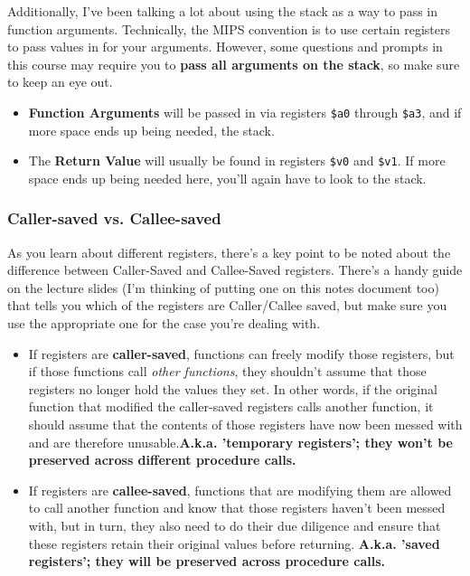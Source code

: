 \documentclass[english, 10pt]{article}
\begin{document}
Additionally, I've been talking a lot about using the stack as a way to pass in function arguments. Technically, the MIPS convention is to use certain registers to pass values in for your arguments. However, some questions and prompts in this course may require you to \textbf{pass all arguments on the stack}, so make sure to keep an eye out.

\begin{itemize}
	\item \textbf{Function Arguments} will be passed in via registers \texttt{\$a0} through \texttt{\$a3}, and if more space ends up being needed, the stack.
	\item The \textbf{Return Value} will usually be found in registers \texttt{\$v0} and \texttt{\$v1}. If more space ends up being needed here, you'll again have to look to the stack. 
\end{itemize}

\subsubsection{Caller-saved vs. Callee-saved}

As you learn about different registers, there's a key point to be noted about the difference between Caller-Saved and Callee-Saved registers. There's a handy guide on the lecture slides (I'm thinking of putting one on this notes document too) that tells you which of the registers are Caller/Callee saved, but make sure you use the appropriate one for the case you're dealing with.\newline

\begin{itemize}
	\item If registers are \textbf{caller-saved}, functions can freely modify those registers, but if those functions call \textit{other functions}, they shouldn't assume that those registers no longer hold the values they set. In other words, if the original function that modified the caller-saved registers calls another function, it should assume that the contents of those registers have now been messed with and are therefore unusable.\textbf{A.k.a. 'temporary registers'; they won't be preserved across different procedure calls.}
	\item If registers are \textbf{callee-saved}, functions that are modifying them are allowed to call another function and know that those registers haven't been messed with, but in turn, they also need to do their due diligence and ensure that these registers retain their original values before returning. \textbf{A.k.a. 'saved registers'; they will be preserved across procedure calls.}
	
\end{itemize}
\end{document}
